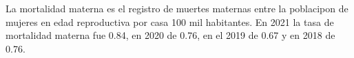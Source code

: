 La mortalidad materna es el registro de muertes maternas entre la poblacipon de mujeres en edad reproductiva por casa 100 mil habitantes. En 2021 la tasa de mortalidad materna fue 0.84, en 2020 de 0.76, en el 2019 de 0.67 y en 2018 de 0.76. 